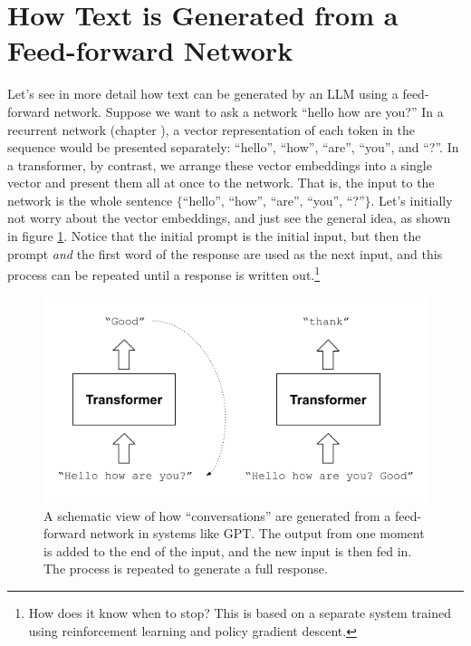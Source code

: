   
\section{How Text is Generated from a Feed-forward Network}


Let's see in more detail how text can be generated by an LLM using a feed-forward network. Suppose we want to ask a network ``hello how are you?'' In a recurrent network (chapter ), a vector representation of each token in the sequence would be presented separately: ``hello'', ``how'', ``are'', ``you'', and ``?''.  In a transformer, by contrast, we arrange these vector embeddings into a single vector and present them all at once to the network. That is, the input to the network is the whole sentence $\{$``hello'', ``how'', ``are'', ``you'', ``?''$\}$. Let's initially not worry about the vector embeddings, and just see the general idea, as shown in figure \ref{gptRecursedInputs}. Notice that the initial prompt is the initial input, but then the prompt \emph{and} the first word of the response are used as the next input, and this process can be repeated until a response is written out.\footnote{How does it know when to stop? This is based on a separate system trained using reinforcement learning and policy gradient descent.}
  

\begin{figure}[h]
\centering
\includegraphics[scale=.7]{./images/gptRecursedInputs.png}
\caption[Jeff Yoshimi]{A schematic view of how ``conversations'' are generated from a feed-forward network in systems like GPT. The output from one moment is added to the end of the input, and the new input is then fed in. The process is repeated to generate a full response.}
\label{gptRecursedInputs}
\end{figure}

